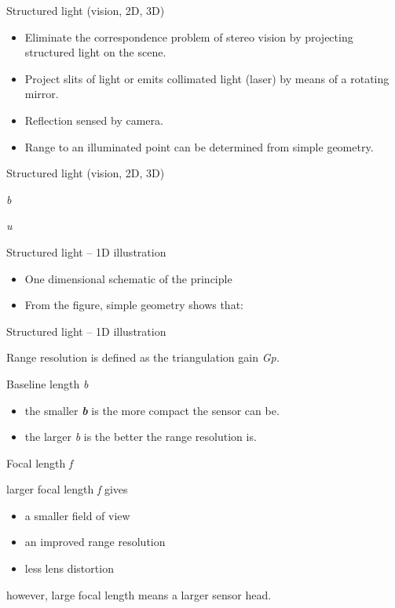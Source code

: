 \documentclass[compress]{beamer}
\providecommand{\tightlist}{%
  \setlength{\itemsep}{0pt}\setlength{\parskip}{0pt}}
\begin{document}
\begin{frame}{Structured light (vision, 2D, 3D)}

\begin{itemize}
\tightlist
\item
  Eliminate the correspondence problem of stereo vision by projecting
  structured light on the scene.
\item
  Project slits of light or emits collimated light (\eg laser) by means
  of a rotating mirror.
\item
  Reflection sensed by camera.
\item
  Range to an illuminated point can be determined from simple geometry.
\end{itemize}

\end{frame}

\begin{frame}{Structured light (vision, 2D, 3D)}

\emph{b}

\emph{u}

\end{frame}

\begin{frame}{Structured light -- 1D illustration}

\begin{itemize}
\tightlist
\item
  One dimensional schematic of the principle
\item
  From the figure, simple geometry shows that:
\end{itemize}

\end{frame}

\begin{frame}{Structured light -- 1D illustration}

Range resolution is defined as the triangulation gain \emph{Gp.}

Baseline length \emph{b}

\begin{itemize}
\tightlist
\item
  the smaller \textbf{\emph{b}} is the more compact the sensor can be.
\item
  the larger \emph{b} is the better the range resolution is.
\end{itemize}

Focal length \emph{f}

larger focal length \emph{f} gives

\begin{itemize}
\tightlist
\item
  a smaller field of view
\item
  an improved range resolution
\item
  less lens distortion
\end{itemize}

however, large focal length means a larger sensor head.

\end{frame}
\end{document}
